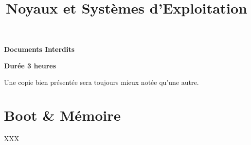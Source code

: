 %
%
%
%
%
%

%
%

%
%

\def\path{../../..}

%
%



%
%

\title{Noyaux et Syst\`emes d'Exploitation}

%
%

\rhead{}

%
%



%
%

\maketitle

%
%

\indentation{}

%
%

\begin{center}

\textbf{Documents Interdits}

\textbf{Dur\'ee 3 heures}

\scriptsize{Une copie bien pr\'esent\'ee sera toujours mieux not\'ee
            qu'une autre.}

\end{center}

%
%

%
%

\section{Boot \& M\'emoire
         {\hfill{} }}

XXX

